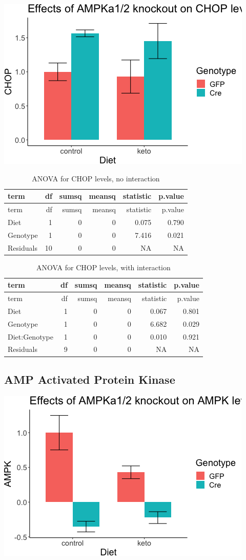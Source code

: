 \documentclass[]{article}
\begin{document}
\includegraphics{figures/chop-barplot-1.png}

\begin{longtable}[]{@{}lrrrrr@{}}
\caption{ANOVA for CHOP levels, no interaction}\tabularnewline
\toprule
term & df & sumsq & meansq & statistic & p.value\tabularnewline
\midrule
\endfirsthead
\toprule
term & df & sumsq & meansq & statistic & p.value\tabularnewline
\midrule
\endhead
Diet & 1 & 0 & 0 & 0.075 & 0.790\tabularnewline
Genotype & 1 & 0 & 0 & 7.416 & 0.021\tabularnewline
Residuals & 10 & 0 & 0 & NA & NA\tabularnewline
\bottomrule
\end{longtable}

\begin{longtable}[]{@{}lrrrrr@{}}
\caption{ANOVA for CHOP levels, with interaction}\tabularnewline
\toprule
term & df & sumsq & meansq & statistic & p.value\tabularnewline
\midrule
\endfirsthead
\toprule
term & df & sumsq & meansq & statistic & p.value\tabularnewline
\midrule
\endhead
Diet & 1 & 0 & 0 & 0.067 & 0.801\tabularnewline
Genotype & 1 & 0 & 0 & 6.682 & 0.029\tabularnewline
Diet:Genotype & 1 & 0 & 0 & 0.010 & 0.921\tabularnewline
Residuals & 9 & 0 & 0 & NA & NA\tabularnewline
\bottomrule
\end{longtable}

\hypertarget{amp-activated-protein-kinase}{%
\subsection{AMP Activated Protein
Kinase}\label{amp-activated-protein-kinase}}

\includegraphics{figures/AMPK-barplot-1.png}
\end{document}
